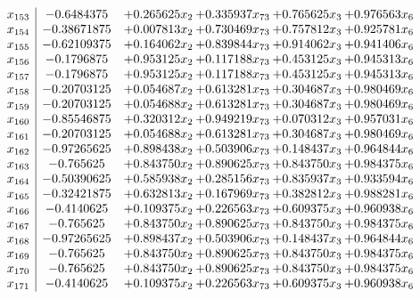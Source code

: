 \documentclass[11pt]{article}
\begin{document}
\[\begin{array}{c| c c@{\hskip 2pt} c@{\hskip 2pt} c@{\hskip 2pt} c@{\hskip 2pt} }
 x_{153}   &  -0.6484375 & + 0.265625 x_{2} & + 0.335937 x_{73} & + 0.765625 x_{3} & + 0.976563 x_{6}\\
 x_{154}   &  -0.38671875 & + 0.007813 x_{2} & + 0.730469 x_{73} & + 0.757812 x_{3} & + 0.925781 x_{6}\\
 x_{155}   &  -0.62109375 & + 0.164062 x_{2} & + 0.839844 x_{73} & + 0.914062 x_{3} & + 0.941406 x_{6}\\
 x_{156}   &  -0.1796875 & + 0.953125 x_{2} & + 0.117188 x_{73} & + 0.453125 x_{3} & + 0.945313 x_{6}\\
 x_{157}   &  -0.1796875 & + 0.953125 x_{2} & + 0.117188 x_{73} & + 0.453125 x_{3} & + 0.945313 x_{6}\\
 x_{158}   &  -0.20703125 & + 0.054687 x_{2} & + 0.613281 x_{73} & + 0.304687 x_{3} & + 0.980469 x_{6}\\
 x_{159}   &  -0.20703125 & + 0.054688 x_{2} & + 0.613281 x_{73} & + 0.304687 x_{3} & + 0.980469 x_{6}\\
 x_{160}   &  -0.85546875 & + 0.320312 x_{2} & + 0.949219 x_{73} & + 0.070312 x_{3} & + 0.957031 x_{6}\\
 x_{161}   &  -0.20703125 & + 0.054688 x_{2} & + 0.613281 x_{73} & + 0.304687 x_{3} & + 0.980469 x_{6}\\
 x_{162}   &  -0.97265625 & + 0.898438 x_{2} & + 0.503906 x_{73} & + 0.148437 x_{3} & + 0.964844 x_{6}\\
 x_{163}   &  -0.765625 & + 0.843750 x_{2} & + 0.890625 x_{73} & + 0.843750 x_{3} & + 0.984375 x_{6}\\
 x_{164}   &  -0.50390625 & + 0.585938 x_{2} & + 0.285156 x_{73} & + 0.835937 x_{3} & + 0.933594 x_{6}\\
 x_{165}   &  -0.32421875 & + 0.632813 x_{2} & + 0.167969 x_{73} & + 0.382812 x_{3} & + 0.988281 x_{6}\\
 x_{166}   &  -0.4140625 & + 0.109375 x_{2} & + 0.226563 x_{73} & + 0.609375 x_{3} & + 0.960938 x_{6}\\
 x_{167}   &  -0.765625 & + 0.843750 x_{2} & + 0.890625 x_{73} & + 0.843750 x_{3} & + 0.984375 x_{6}\\
 x_{168}   &  -0.97265625 & + 0.898437 x_{2} & + 0.503906 x_{73} & + 0.148437 x_{3} & + 0.964844 x_{6}\\
 x_{169}   &  -0.765625 & + 0.843750 x_{2} & + 0.890625 x_{73} & + 0.843750 x_{3} & + 0.984375 x_{6}\\
 x_{170}   &  -0.765625 & + 0.843750 x_{2} & + 0.890625 x_{73} & + 0.843750 x_{3} & + 0.984375 x_{6}\\
 x_{171}   &  -0.4140625 & + 0.109375 x_{2} & + 0.226563 x_{73} & + 0.609375 x_{3} & + 0.960938 x_{6}\\

\end{array}\]
\end{document}
